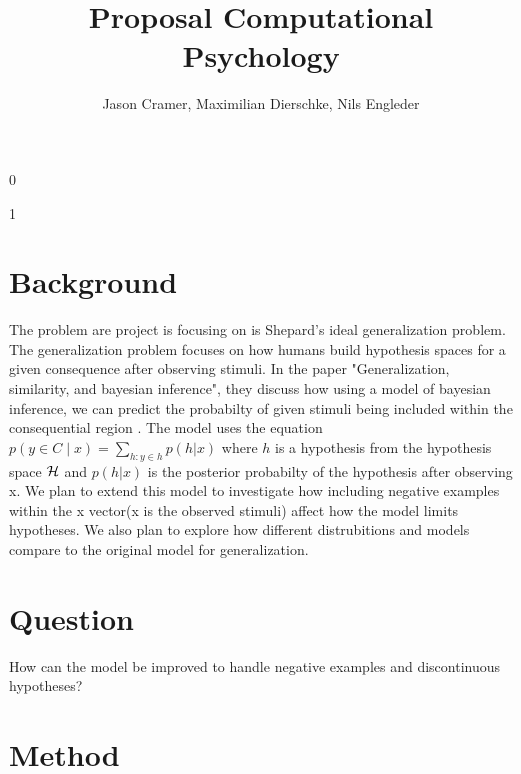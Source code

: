 \documentclass[]{scrartcl}
\title{Proposal Computational Psychology}
\begin{document}
\def\isblind{1}
\if\isblind0
    \author{Jason Cramer, Maximilian Dierschke, Nils Engleder}\fi
\if \isblind1
    \author{}\fi
\maketitle
\section{Background}
The problem are project is focusing on is Shepard's ideal generalization problem. The generalization problem focuses on how humans build hypothesis spaces for a given consequence after observing stimuli.
In the paper "Generalization, similarity, and bayesian inference", they discuss how using a model of bayesian inference, we can predict the probabilty of given stimuli being included within the consequential region \cite{Tenenbaum}.
The model uses the equation $p(y \in C \mid x) = \sum\limits_{h:y\in h} p(h | x)$ where $h$ is a hypothesis from the hypothesis space ${\cal H}$ and $p(h | x)$ is the posterior probabilty of  the hypothesis after observing x.
We plan to extend this model to investigate how including negative examples within the x vector(x is the observed stimuli) affect how the model limits hypotheses. We also plan to explore how different distrubitions and models compare to the original model for generalization.
\section{Question}
How can the model be improved to handle negative examples and discontinuous hypotheses?
\section{Method}

\nocite{*}
\printbibliography
\end{document}
